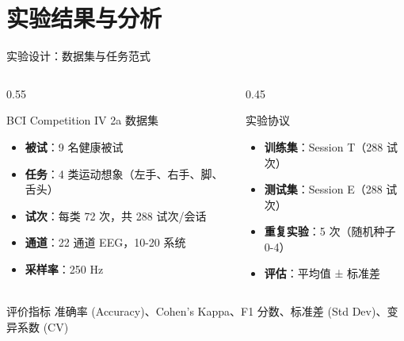 \section{实验结果与分析}

\begin{frame}{实验设计：数据集与任务范式}
    \begin{columns}[T]
        \begin{column}{0.55\textwidth}
            \begin{block}{\normalsize \textcolor{primaryblue}{BCI Competition IV 2a 数据集}}
                \begin{itemize}
                    \item \textbf{被试}：9 名健康被试
                    \item \textbf{任务}：4 类运动想象（左手、右手、脚、舌头）
                    \item \textbf{试次}：每类 72 次，共 288 试次/会话
                    \item \textbf{通道}：22 通道 EEG，10-20 系统
                    \item \textbf{采样率}：250 Hz
                \end{itemize}
            \end{block}
        \end{column}

        \begin{column}{0.45\textwidth}
            \begin{alertblock}{\normalsize 实验协议}
                \begin{itemize}
                    \item \textbf{训练集}：Session T（288 试次）
                    \item \textbf{测试集}：Session E（288 试次）
                    \item \textbf{重复实验}：5 次（随机种子 0-4）
                    \item \textbf{评估}：平均值 ± 标准差
                \end{itemize}
            \end{alertblock}
        \end{column}
    \end{columns}

    \vspace{0.5em}

    \begin{exampleblock}{\normalsize 评价指标}
        准确率 (Accuracy)、Cohen's Kappa、F1 分数、标准差 (Std Dev)、变异系数 (CV)
    \end{exampleblock}
\end{frame}


